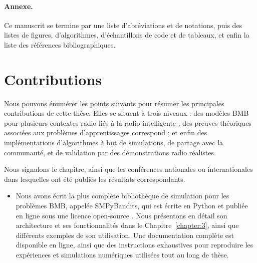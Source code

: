 \begin{resume_fr}
\paragraph{Annexe.}
%
Ce manuscrit se termine par
une liste d'abréviations et de notations, puis des listes de figures, d'algorithmes, d'échantillons de code et de tableaux,
et enfin la liste des références bibliographiques.




\section*{Contributions}

Nous pouvons énumérer les points suivants pour résumer les principales contributions de cette thèse.
Elles se situent à trois niveaux : des modèles BMB pour plusieurs contextes radio liés à la radio intelligente ; des preuves théoriques associées aux problèmes d'apprentissages correspond ; et enfin des implémentations d'algorithmes à but de simulations, de partage avec la communauté, et de validation par des démonstrations radio réalistes.

Nous signalons le chapitre, ainsi que les conférences nationales ou internationales dans lesquelles ont été publiés les résultats correspondants.

\begin{itemize}


    \item
    Nous avons écrit la plus complète bibliothèque de simulation pour les problèmes BMB, appelée SMPyBandits, qui est écrite en Python et publiée en ligne sous une licence open-source \cite{SMPyBanditsJMLR,SMPyBandits}.
    Nous présentons en détail son architecture et ses fonctionnalités dans le Chapitre~\ref{chapter:3}, ainsi que différents exemples de son utilisation.
    Une documentation complète est disponible en ligne, ainsi que des instructions exhaustives pour reproduire les expériences et simulations numériques utilisées tout au long de thèse.


\end{itemize}
\end{resume_fr}
